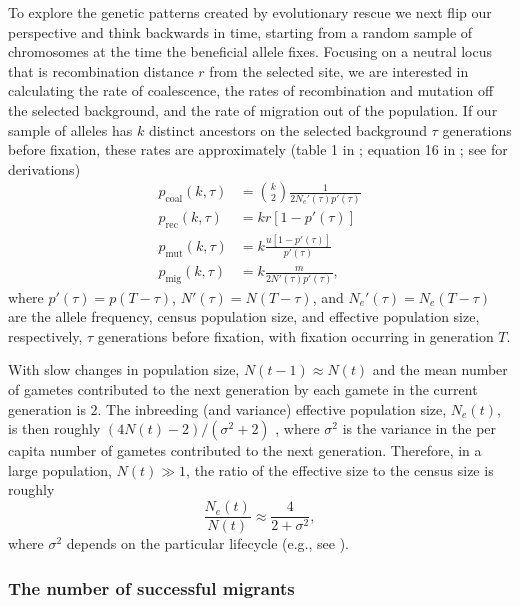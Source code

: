 \documentclass[]{article}
\begin{document}
To explore the genetic patterns created by evolutionary rescue we next flip our perspective and think backwards in time, starting from a random sample of chromosomes at the time the beneficial allele fixes.
Focusing on a neutral locus that is recombination distance $r$ from the selected site, we are interested in calculating the rate of coalescence, the rates of recombination and mutation off the selected background, and the rate of migration out of the population.
If our sample of alleles has $k$ distinct ancestors on the selected background $\tau$ generations before fixation, these rates are approximately (table 1 in \citealp{hudson1988coalescent}; equation 16 in \citealp{pennings2006soft2}; see  for derivations)
\begin{equation}\label{eq:coal_rates}
\begin{aligned}
p_{\mathrm{coal}}(k,\tau) &= \binom{k}{2} \frac{1}{2N_e'(\tau) p'(\tau)}\\
p_{\mathrm{rec}}(k,\tau) &= k r [1 - p'(\tau)]\\
p_{\mathrm{mut}}(k,\tau) &= k \frac{u [1 - p'(\tau)]}{p'(\tau)}\\
p_{\mathrm{mig}}(k,\tau) &= k \frac{m}{2N'(\tau)p'(\tau)},
\end{aligned}
\end{equation} 
where $p'(\tau) = p(T - \tau)$, $N'(\tau)=N(T-\tau)$, and $N_e'(\tau) = N_e(T - \tau)$ are the allele frequency, census population size, and effective population size, respectively, $\tau$ generations before fixation, with fixation occurring in generation $T$.

With slow changes in population size, $N(t-1)\approx N(t)$ and the mean number of gametes contributed to the next generation by each gamete in the current generation is $2$.
The inbreeding (and variance) effective population size, $N_e(t)$, is then roughly $(4N(t) - 2)/(\sigma^2+2)$ \citep[equation 7.6.4.3 in][]{crow1970introduction}, where $\sigma^2$ is the variance in the per capita number of gametes contributed to the next generation.
Therefore, in a large population, $N(t)\gg1$, the ratio of the effective size to the census size is roughly
\begin{equation}\label{eq:Ne}
\frac{N_e(t)}{N(t)} \approx \frac{4}{2+\sigma^2},
\end{equation}
where $\sigma^2$ depends on the particular lifecycle (e.g., see ). 

\subsubsection*{The number of successful migrants}
\label{sec:ewens_migrants}
\end{document}
